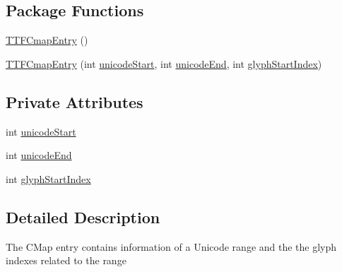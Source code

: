 \subsection*{Package Functions}
\begin{DoxyCompactItemize}
\item 
\mbox{\hyperlink{classorg_1_1newdawn_1_1slick_1_1tools_1_1hiero_1_1truetype_1_1_t_t_f_cmap_entry_adb6f5da92279a3d136d4c30863e587c9}{T\+T\+F\+Cmap\+Entry}} ()
\item 
\mbox{\hyperlink{classorg_1_1newdawn_1_1slick_1_1tools_1_1hiero_1_1truetype_1_1_t_t_f_cmap_entry_a49767238386be36cb9c85f6d49fe75d7}{T\+T\+F\+Cmap\+Entry}} (int \mbox{\hyperlink{classorg_1_1newdawn_1_1slick_1_1tools_1_1hiero_1_1truetype_1_1_t_t_f_cmap_entry_abfc190d70995c9dab4cd3a9c42695f61}{unicode\+Start}}, int \mbox{\hyperlink{classorg_1_1newdawn_1_1slick_1_1tools_1_1hiero_1_1truetype_1_1_t_t_f_cmap_entry_acffa8eba3c1a7ba50e48c20edbc176b6}{unicode\+End}}, int \mbox{\hyperlink{classorg_1_1newdawn_1_1slick_1_1tools_1_1hiero_1_1truetype_1_1_t_t_f_cmap_entry_ad7d0da37875efc20244b93ad930d73ad}{glyph\+Start\+Index}})
\end{DoxyCompactItemize}
\subsection*{Private Attributes}
\begin{DoxyCompactItemize}
\item 
int \mbox{\hyperlink{classorg_1_1newdawn_1_1slick_1_1tools_1_1hiero_1_1truetype_1_1_t_t_f_cmap_entry_abfc190d70995c9dab4cd3a9c42695f61}{unicode\+Start}}
\item 
int \mbox{\hyperlink{classorg_1_1newdawn_1_1slick_1_1tools_1_1hiero_1_1truetype_1_1_t_t_f_cmap_entry_acffa8eba3c1a7ba50e48c20edbc176b6}{unicode\+End}}
\item 
int \mbox{\hyperlink{classorg_1_1newdawn_1_1slick_1_1tools_1_1hiero_1_1truetype_1_1_t_t_f_cmap_entry_ad7d0da37875efc20244b93ad930d73ad}{glyph\+Start\+Index}}
\end{DoxyCompactItemize}


\subsection{Detailed Description}
The C\+Map entry contains information of a Unicode range and the the glyph indexes related to the range 

